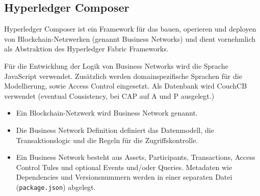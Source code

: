 \subsection{Hyperledger Composer}
        Hyperledger Composer ist ein Framework für das bauen, operieren und deployen von Blockchain-Netzwerken (genannt Business Networks) und dient vornehmlich als Abstraktion des Hyperledger Fabric Frameworks. 
        
        
        Für die Entwicklung der Logik von Business Networks wird die Sprache JavaScript verwendet. 
        Zusätzlich werden domainspezifische Sprachen für die Modellierung, sowie Access Control eingesetzt.
        Als Datenbank wird CouchCB verwendet (eventual Consistency, bei CAP auf A und P ausgelegt.)
        
        \begin{itemize}[noitemsep]
            \item Ein Blockchain-Netzwerk wird Business Network genannt. 
            \item Die Business Network Definition definiert das Datenmodell, die Transaktionslogic und die Regeln für die Zugriffskontrolle.
            \item Ein Business Network besteht aus Assets, Participants, Transactions, Access Control Tules und optional Events und/\-oder Queries.
                Metadaten wie Dependencies und Versionsnummern werden in einer separaten Datei (\colorbox{light-gray}{\lstinline|package.json|}) abgelegt.
        \end{itemize}
        
